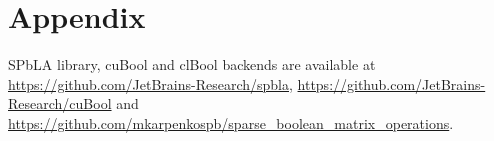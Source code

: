 \section*{Appendix}

SPbLA library, cuBool and clBool backends are available at \url{https://github.com/JetBrains-Research/spbla}, \url{https://github.com/JetBrains-Research/cuBool} 
and \url{https://github.com/mkarpenkospb/sparse_boolean_matrix_operations}.

